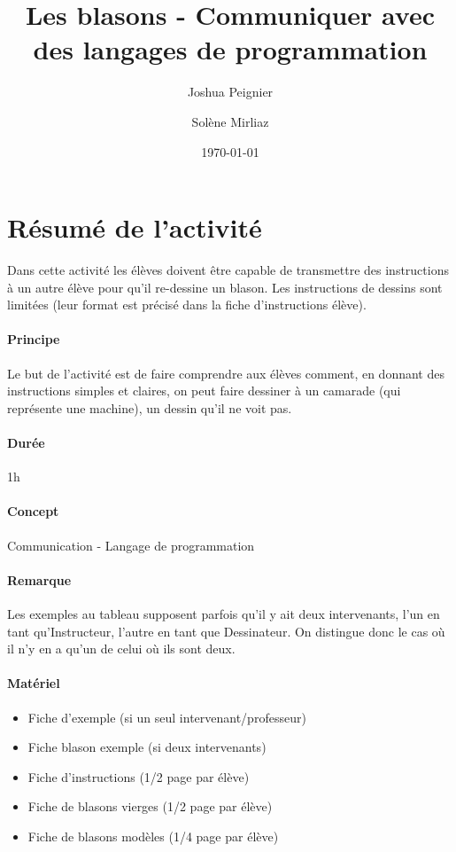 \documentclass{article}
\title{Les blasons - Communiquer avec des langages de programmation}
\author{Joshua Peignier \and Solène Mirliaz}
\date{\today}
\begin{document}
\maketitle
\section{Résumé de l'activité}
Dans cette activité les élèves doivent être capable de transmettre des instructions à un autre élève pour qu'il re-dessine un blason. Les instructions de dessins sont limitées (leur format est précisé dans la fiche d'instructions élève).

\paragraph{Principe} Le but de l'activité est de faire comprendre aux élèves comment, en donnant des instructions simples et claires, on peut faire dessiner à un camarade (qui représente une machine), un dessin qu'il ne voit pas.


\paragraph{Durée} 1h


\paragraph{Concept} Communication - Langage de programmation

\paragraph{Remarque} Les exemples au tableau supposent parfois qu'il y ait deux intervenants, l'un en tant qu'Instructeur, l'autre en tant que Dessinateur. On distingue donc le cas où il n'y en a qu'un de celui où ils sont deux.

\paragraph{Matériel}
\begin{itemize}
  \item Fiche d'exemple (si un seul intervenant/professeur)
  \item Fiche blason exemple (si deux intervenants)
  \item Fiche d'instructions (1/2 page par élève)
  \item Fiche de blasons vierges (1/2 page par élève)
  \item Fiche de blasons modèles (1/4 page par élève)
\end{itemize}
\end{document}
